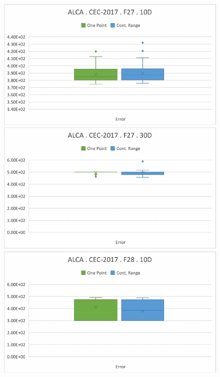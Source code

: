 \documentclass[graybox]{svmult}
\begin{document}
    \begin{figure}[!ht]
        \begin{minipage}[h]{0.49\linewidth}
            \includegraphics[width=1\linewidth]{img/fig_experiment_F27x10D.pdf} 
        \end{minipage}
        \hfill
        \vspace{0.05 cm}
        \begin{minipage}[h]{0.49\linewidth}
            \includegraphics[width=1\linewidth]{img/fig_experiment_F27x30D.pdf} 
        \end{minipage}
        \vfill
        \vspace{0.05 cm}
        \begin{minipage}[h]{0.49\linewidth}
            \includegraphics[width=1\linewidth]{img/fig_experiment_F28x10D.pdf} 

\end{minipage}
\end{figure}
\end{document}
